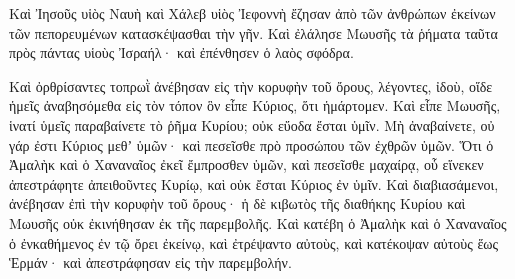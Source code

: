 {Καὶ Ἰησοῦς υἱὸς Ναυὴ καὶ Χάλεβ υἱὸς Ἰεφοννὴ ἔζησαν ἀπὸ τῶν ἀνθρώπων ἐκείνων τῶν πεπορευμένων κατασκέψασθαι τὴν γῆν.
Καὶ ἐλάλησε Μωυσῆς τὰ ῥήματα ταῦτα πρὸς πάντας υἱοὺς Ἰσραήλ· καὶ ἐπένθησεν ὁ λαὸς σφόδρα.
\par }{\PP {}Καὶ ὀρθρίσαντες τοπρωῒ ἀνέβησαν εἰς τὴν κορυφὴν τοῦ ὄρους, λέγοντες, ἰδοὺ, οἵδε ἡμεῖς ἀναβησόμεθα εἰς τὸν τόπον ὃν εἶπε Κύριος, ὅτι ἡμάρτομεν.
Καὶ εἶπε Μωυσῆς, ἱνατί ὑμεῖς παραβαίνετε τὸ ῥῆμα Κυρίου; οὐκ εὔοδα ἔσται ὑμῖν.
Μὴ ἀναβαίνετε, οὐ γάρ ἐστι Κύριος μεθʼ ὑμῶν· καὶ πεσεῖσθε πρὸ προσώπου τῶν ἐχθρῶν ὑμῶν.
Ὅτι ὁ Ἀμαλὴκ καὶ ὁ Χαναναῖος ἐκεῖ ἔμπροσθεν ὑμῶν, καὶ πεσεῖσθε μαχαίρᾳ, οὗ εἵνεκεν ἀπεστράφητε ἀπειθοῦντες Κυρίῳ, καὶ οὐκ ἔσται Κύριος ἐν ὑμῖν.
Καὶ διαβιασάμενοι, ἀνέβησαν ἐπὶ τὴν κορυφὴν τοῦ ὄρους· ἡ δὲ κιβωτὸς τῆς διαθήκης Κυρίου καὶ Μωυσῆς οὐκ ἐκινήθησαν ἐκ τῆς παρεμβολῆς.
Καὶ κατέβη ὁ Ἀμαλὴκ καὶ ὁ Χαναναῖος ὁ ἐνκαθήμενος ἐν τῷ ὄρει ἐκείνῳ, καὶ ἐτρέψαντο αὐτοὺς, καὶ κατέκοψαν αὐτοὺς ἕως Ἑρμάν· καὶ ἀπεστράφησαν εἰς τὴν παρεμβολήν.

}
